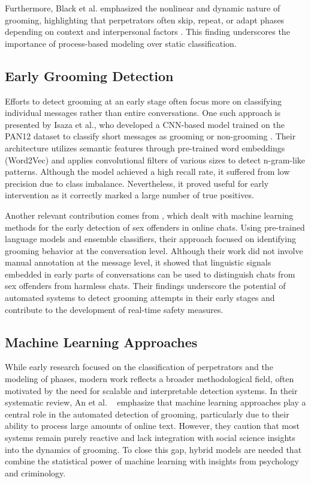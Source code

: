 Furthermore, Black et al. emphasized the nonlinear and dynamic nature of grooming, highlighting that perpetrators often skip, repeat, or adapt phases depending on context and interpersonal factors \parencite{black2015linguistic}. This finding underscores the importance of process-based modeling over static classification. %


\subsection{Early Grooming Detection}


Efforts to detect grooming at an early stage often focus more on classifying individual messages rather than entire conversations. One such approach is presented by Isaza et al., who developed a CNN-based model trained on the PAN12 dataset to classify short messages as grooming or non-grooming \parencite{Isaza2022classifying}. Their architecture utilizes semantic features through pre-trained word embeddings (Word2Vec) and applies convolutional filters of various sizes to detect n-gram-like patterns. Although the model achieved a high recall rate, it suffered from low precision due to class imbalance. Nevertheless, it proved useful for early intervention as it correctly marked a large number of true positives.  %

Another relevant contribution comes from \textcite{schlaepfer2022online}, which dealt with machine learning methods for the early detection of sex offenders in online chats. Using pre-trained language models and ensemble classifiers, their approach focused on identifying grooming behavior at the conversation level. Although their work did not involve manual annotation at the message level, it showed that linguistic signals embedded in early parts of conversations can be used to distinguish chats from sex offenders from harmless chats. Their findings underscore the potential of automated systems to detect grooming attempts in their early stages and contribute to the development of real-time safety measures. %


\subsection{Machine Learning Approaches}

While early research focused on the classification of perpetrators and the modeling of phases, modern work reflects a broader methodological field, often motivated by the need for scalable and interpretable detection systems. In their systematic review, An et al. \ \parencite{an2025cybergrooming} emphasize that machine learning approaches play a central role in the automated detection of grooming, particularly due to their ability to process large amounts of online text. However, they caution that most systems remain purely reactive and lack integration with social science insights into the dynamics of grooming. To close this gap, hybrid models are needed that combine the statistical power of machine learning with insights from psychology and criminology.

